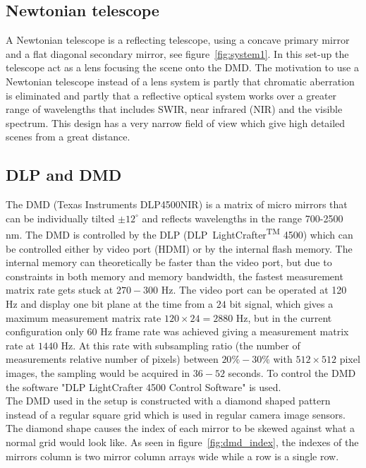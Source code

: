 \subsection{Newtonian telescope}
A Newtonian telescope is a reflecting telescope, using a concave primary mirror and a flat diagonal secondary mirror, see figure~\ref{fig:system1}. In this set-up the telescope act as a lens focusing the scene onto the DMD. The motivation to use a Newtonian telescope instead of a lens system is partly that chromatic aberration is eliminated and partly that a reflective optical system works over a greater range of wavelengths that includes SWIR, near infrared (NIR) and the visible spectrum. This design has a very narrow field of view which give high detailed scenes from a great distance. 


\subsection{DLP and DMD}
The DMD (Texas Instruments DLP4500NIR) is a matrix of micro mirrors that can be individually tilted $\pm 12^{\circ}$ and reflects wavelengths in the range 700-2500 nm. The DMD is controlled by the DLP (DLP\textregistered ~LightCrafter\textsuperscript{TM} 4500) which can be controlled either by video port (HDMI) or by the internal flash memory. The internal memory can theoretically be faster than the video port, but due to constraints in both memory and memory bandwidth, the fastest measurement matrix rate gets stuck at $270 - 300$ Hz. The video port can be operated at 120 Hz and display one bit plane at the time from a $24$ bit signal, which gives a maximum measurement matrix rate $120 \times 24 = 2880$ Hz, but in the current configuration only $60$ Hz frame rate was achieved giving a measurement matrix rate at $1440$ Hz. At this rate with subsampling ratio (the number of measurements relative number of pixels) between $20\% - 30\%$ with $512\times512$ pixel images, the sampling would be acquired in $36 - 52$ seconds. To control the DMD the software "DLP LightCrafter 4500 Control Software" is used.\cite{manual:DLP}\\[0.1in] 

The DMD used in the setup is constructed with a diamond shaped pattern instead of a regular square grid which is used in regular camera image sensors. The diamond shape causes the index of each mirror to be skewed against what a normal grid would look like. As seen in figure~\ref{fig:dmd_index}, the indexes of the mirrors column is two mirror column arrays wide while a row is a single row. 


